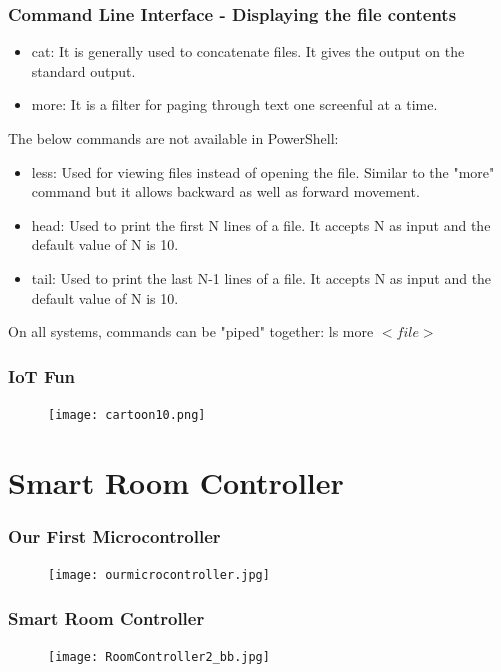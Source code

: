 \documentclass{beamer}
\begin{document}
\begin{frame}\frametitle{Command Line Interface - Displaying the file contents}
\begin{itemize}
\item cat: It is generally used to concatenate files. It gives the output on the standard output.
\item more: It is a filter for paging through text one screenful at a time.
\end{itemize}
The below commands are not available in PowerShell:
\begin{itemize}
\item less: Used for viewing files instead of opening the file. Similar to the "more" command but it allows backward as well as forward movement.
\item head: Used to print the first N lines of a file. It accepts N as input and the default value of N is 10.
\item tail: Used to print the last N-1 lines of a file. It accepts N as input and the default value of N is 10.
\end{itemize}

\vspace{0.25cm}
On all systems, commands can be "piped" together: ls \textbar  \: more $<file>$
\end{frame}


\begin{frame}\frametitle{IoT Fun}
\begin{figure}[h]
	\texttt{[image: cartoon10.png]}
\end{figure}
\end{frame}



\section{Smart Room Controller}

\begin{frame}\frametitle{Our First Microcontroller}
\begin{figure}[h]
	\texttt{[image: ourmicrocontroller.jpg]}
\end{figure}
\end{frame}

\begin{frame}\frametitle{Smart Room Controller}
\begin{figure}[h]
	\texttt{[image: RoomController2\_bb.jpg]}
\end{figure}
\end{frame}
\end{document}
